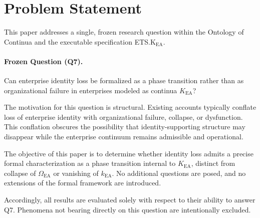 ﻿\section{Problem Statement}

This paper addresses a single, frozen research question within the Ontology of
Continua and the executable specification ETS.K$_{\mathrm{EA}}$.

\paragraph{Frozen Question (Q7).}
Can enterprise identity loss be formalized as a phase transition rather than as
organizational failure in enterprises modeled as continua $K_{\mathrm{EA}}$?

The motivation for this question is structural. Existing accounts typically
conflate loss of enterprise identity with organizational failure, collapse, or
dysfunction. This conflation obscures the possibility that identity-supporting
structure may disappear while the enterprise continuum remains admissible and
operational.

The objective of this paper is to determine whether identity loss admits a
precise formal characterization as a phase transition internal to
$K_{\mathrm{EA}}$, distinct from collapse of $\Omega_{\mathrm{EA}}$ or vanishing
of $k_{\mathrm{EA}}$. No additional questions are posed, and no extensions of the
formal framework are introduced.

Accordingly, all results are evaluated solely with respect to their ability to
answer Q7. Phenomena not bearing directly on this question are intentionally
excluded.
